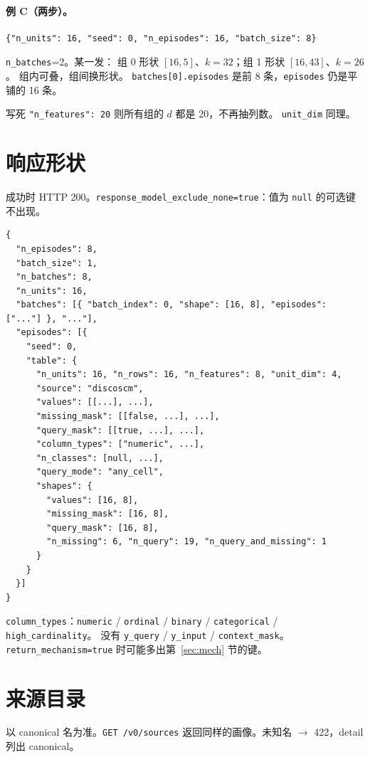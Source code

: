 \documentclass[11pt,a4paper,fontset=none]{ctexart}
\begin{document}
\paragraph{例 C（两步）。}
\begin{lstlisting}
{"n_units": 16, "seed": 0, "n_episodes": 16, "batch_size": 8}
\end{lstlisting}
\texttt{n\_batches}=2。某一发：
组 0 形状 $[16,5]$、$k=32$；组 1 形状 $[16,43]$、$k=26$。
组内可叠，组间换形状。
\texttt{batches[0].episodes} 是前 8 条，\texttt{episodes} 仍是平铺的 16 条。

写死 \texttt{"n\_features": 20} 则所有组的 $d$ 都是 20，不再抽列数。
\texttt{unit\_dim} 同理。

\section{响应形状}

成功时 HTTP 200。\texttt{response\_model\_exclude\_none=true}：值为 \texttt{null} 的可选键不出现。

\begin{lstlisting}
{
  "n_episodes": 8,
  "batch_size": 1,
  "n_batches": 8,
  "n_units": 16,
  "batches": [{ "batch_index": 0, "shape": [16, 8], "episodes": ["..."] }, "..."],
  "episodes": [{
    "seed": 0,
    "table": {
      "n_units": 16, "n_rows": 16, "n_features": 8, "unit_dim": 4,
      "source": "discoscm",
      "values": [[...], ...],
      "missing_mask": [[false, ...], ...],
      "query_mask": [[true, ...], ...],
      "column_types": ["numeric", ...],
      "n_classes": [null, ...],
      "query_mode": "any_cell",
      "shapes": {
        "values": [16, 8],
        "missing_mask": [16, 8],
        "query_mask": [16, 8],
        "n_missing": 6, "n_query": 19, "n_query_and_missing": 1
      }
    }
  }]
}
\end{lstlisting}

\texttt{column\_types}：\texttt{numeric} / \texttt{ordinal} / \texttt{binary} / \texttt{categorical} / \texttt{high\_cardinality}。
没有 \texttt{y\_query} / \texttt{y\_input} / \texttt{context\_mask}。
\texttt{return\_mechanism=true} 时可能多出第~\ref{sec:mech} 节的键。

\section{来源目录}

以 canonical 名为准。\texttt{GET /v0/sources} 返回同样的画像。未知名 $\to$ 422，detail 列出 canonical。
\end{document}
